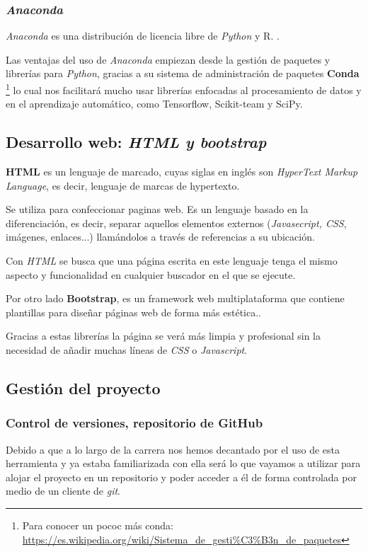 \subsubsection{\textit{Anaconda}}
\textit{Anaconda} es una distribución de licencia libre de \textit{Python} y R. \cite{ana}.

Las ventajas del uso de \textit{Anaconda} empiezan desde la gestión de paquetes y librerías para \textit{Python}, gracias a su sistema de administración de paquetes \textbf{Conda} \footnote{Para conocer un pococ más conda: \url{https://es.wikipedia.org/wiki/Sistema_de_gesti\%C3\%B3n_de_paquetes}}
lo cual nos facilitará mucho usar librerías enfocadas al procesamiento de datos y en el aprendizaje automático, como Tensorflow, Scikit-team y SciPy.


\subsection{Desarrollo web: \textit{HTML y bootstrap}}
\textbf{HTML} es un lenguaje de marcado, cuyas siglas en inglés son \textit{HyperText Markup Language}\cite{html}, es decir, lenguaje de marcas de hypertexto.

Se utiliza para confeccionar paginas web. Es un lenguaje basado en la diferenciación, es decir, separar aquellos elementos externos (\textit{Javasecript, CSS}, imágenes, enlaces...) llamándolos a través de referencias a su ubicación.

Con \textit{HTML} se busca que una página escrita en este lenguaje tenga el mismo aspecto y funcionalidad en cualquier buscador en el que se ejecute.

Por otro lado \textbf{Bootstrap}, es un  framework web multiplataforma que contiene plantillas para diseñar páginas web de forma más estética.\cite{bootstrap}.

Gracias a estas librerías la página se verá más limpia y profesional sin la necesidad de añadir muchas líneas de \textit{CSS} o \textit{Javascript}.
 

\subsection{Gestión del proyecto}
\subsubsection{Control de versiones, repositorio de GitHub}

Debido a que a lo largo de la carrera nos hemos decantado por el uso de esta herramienta y ya estaba familiarizada con ella será lo que vayamos a utilizar para alojar el proyecto en un repositorio y poder acceder a él de forma controlada por medio de un cliente de \textit{git}.


